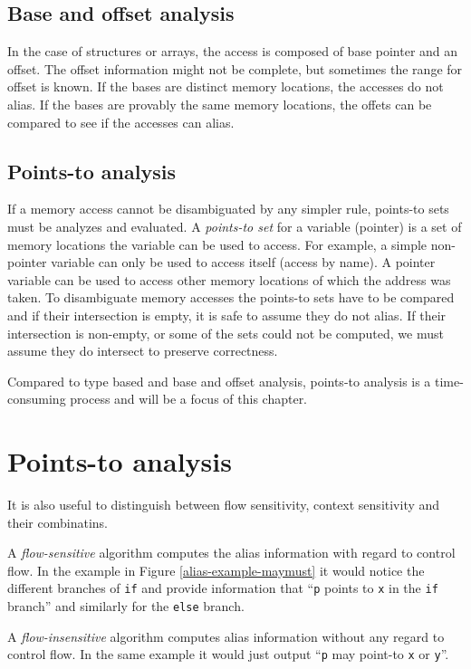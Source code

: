 \subsection{Base and offset analysis}

In the case of structures or arrays, the access is composed of base pointer and
an offset. The offset information might not be complete, but sometimes the range
for offset is known. If the bases are distinct memory locations, the accesses do
not alias.  If the bases are provably the same memory locations, the offets can
be compared to see if the accesses can alias.

\subsection{Points-to analysis}

If a memory access cannot be disambiguated by any simpler rule, points-to sets
must be analyzes and evaluated. A {\it points-to set} for a variable (pointer)
is a set of memory locations the variable can be used to access. For example, a
simple non-pointer variable can only be used to access itself (access by name).
A pointer variable can be used to access other memory locations of which the
address was taken. To disambiguate memory accesses the points-to sets have to be
compared and if their intersection is empty, it is safe to assume they do not
alias. If their intersection is non-empty, or some of the sets could not be
computed, we must assume they do intersect to preserve correctness.

Compared to type based and base and offset analysis, points-to analysis is a
time-consuming process and will be a focus of this chapter.


\section{Points-to analysis}


It is also useful to distinguish between flow sensitivity, context sensitivity
and their combinatins.

A {\it flow-sensitive} algorithm computes the alias information with regard to control
flow. In the example in Figure \ref{alias-example-maymust} it would notice the
different branches of {\tt if} and provide information that ``{\tt p} points to
{\tt x} in the {\tt if} branch'' and similarly for the {\tt else} branch.

A {\it flow-insensitive} algorithm computes alias information without any regard
to control flow. In the same example it would just output ``{\tt p} may point-to
{\tt x} or {\tt y}''.

